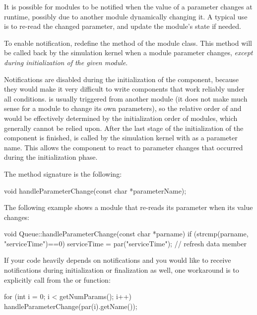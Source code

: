 It is possible for modules to be notified when the value of a
parameter changes at runtime, possibly due to another module
dynamically changing it. A typical use is to re-read the changed
parameter, and update the module's state if needed.

To enable notification, redefine the  method
of the module class. This method will be called back by the
simulation kernel when a module parameter changes, \textit{except during
initialization of the given module}.

\begin{note}
  Notifications are disabled during the initialization of the component,
  because they would make it very difficult to write components
  that work reliably under all conditions.
   is usually triggered from another
  module (it does not make much sense for a module to change
  its own parameters), so the relative order of
   and 
  would be effectively determined by the initialization order
  of modules, which generally cannot be relied upon. After the last
  stage of the initialization of the component is finished,
   is called by the simulation kernel
  with  as a parameter name. This allows the component
  to react to parameter changes that occurred during the initialization phase.
\end{note}

The method signature is the following:

\begin{cpp}
void handleParameterChange(const char *parameterName);
\end{cpp}

The following example shows a module that re-reads
its  parameter when its value changes:

\begin{cpp}
void Queue::handleParameterChange(const char *parname)
{
    if (strcmp(parname, "serviceTime")==0)
        serviceTime = par("serviceTime"); // refresh data member
}
\end{cpp}

If your code heavily depends on notifications and you would like to
receive notifications during initialization or finalization as well, one
workaround is to explicitly call 
from the  or  function:

\begin{cpp}
for (int i = 0; i < getNumParams(); i++)
    handleParameterChange(par(i).getName());
\end{cpp}

